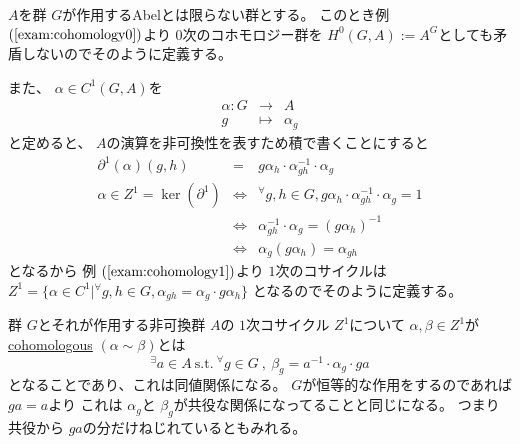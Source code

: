 \documentclass[../master_galois_theory]{subfiles}
\begin{document}
\begin{defi}
  $A$を群 $G$が作用する\rm{Abel}とは限らない群とする。
  このとき例 $(\mathrm{\ref{exam:cohomology0}})$より
  $0$次のコホモロジー群を
  $H^0(G,A) := A^G$としても矛盾しないのでそのように定義する。

  また、 $\alpha \in C^1(G,A)$を
  \begin{eqnarray*}
    \alpha : G & \longrightarrow & A \\
    g & \longmapsto & \alpha_g
  \end{eqnarray*}
  と定めると、 $A$の演算を非可換性を表すため積で書くことにすると
  \begin{eqnarray*}
    \partial^1(\alpha)(g , h) & = & g \alpha_h \cdot \alpha_{gh}^{-1} \cdot \alpha_g \\
    \alpha \in Z^1 = \ker(\partial^1) & \Leftrightarrow & {}^\forall g , h \in G , g \alpha_h \cdot \alpha_{gh}^{-1} \cdot \alpha_g = 1 \\
    & \Leftrightarrow & \alpha_{gh}^{-1} \cdot \alpha_g = (g \alpha_h)^{-1} \\
    & \Leftrightarrow & \alpha_g (g \alpha_h) = \alpha_{gh}
  \end{eqnarray*}
  となるから
  例 $(\mathrm{\ref{exam:cohomology1}})$より
  $1$次のコサイクルは
  $Z^1 = \{ \alpha \in C^1 | {}^\forall g , h \in G , \alpha_{gh} = \alpha_g \cdot g \alpha_h \}$
  となるのでそのように定義する。
\end{defi}

\begin{defi}
  群 $G$とそれが作用する非可換群 $A$の
  $1$次コサイクル $Z^1$について
  $\alpha , \beta \in Z^1$が\underline{\rm{cohomologous}} $(\alpha \sim \beta)$とは
  \[
  {}^\exists a \in A \  \mathrm{s.t.} \
  {}^\forall g \in G \  , \  \beta_g = a^{-1} \cdot \alpha_g \cdot ga
  \]
  となることであり、これは同値関係になる。
  $G$が恒等的な作用をするのであれば $ga = a$より
  これは $\alpha_g$と $\beta_g$が共役な関係になってることと同じになる。
  つまり共役から $ga$の分だけねじれているともみれる。
\end{defi}
\end{document}
